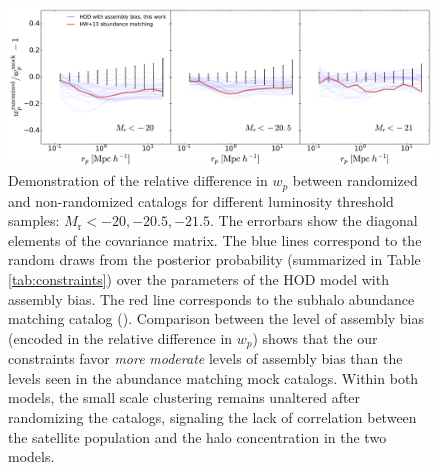 \begin{figure}[p]~\\
\begin{center}
\includegraphics[width=\textwidth]{paper_wprandom.pdf}
 \caption{Demonstration of the relative difference in $w_{p}$ between randomized and non-randomized catalogs for different luminosity threshold samples: $M_{\mathrm r}<-20,-20.5,-21.5$. The errorbars show the diagonal elements of the covariance matrix. The blue lines correspond to the random draws from the posterior probability (summarized in Table \ref{tab:constraints}) over the parameters of the HOD model with assembly bias. The red line corresponds to the subhalo abundance matching catalog (\citealt{hw2013,hearin2014}). Comparison between the level of assembly bias (encoded in the relative difference in $w_p$) shows that the our constraints favor \emph{more} \emph{moderate} levels of assembly bias than the levels seen in the abundance matching mock catalogs. Within both models, the small scale clustering remains unaltered after randomizing the catalogs, signaling the lack of correlation between the satellite population and the halo concentration in the two models.}
\label{fig:randomized}
\end{center}
\end{figure}

\clearpage

